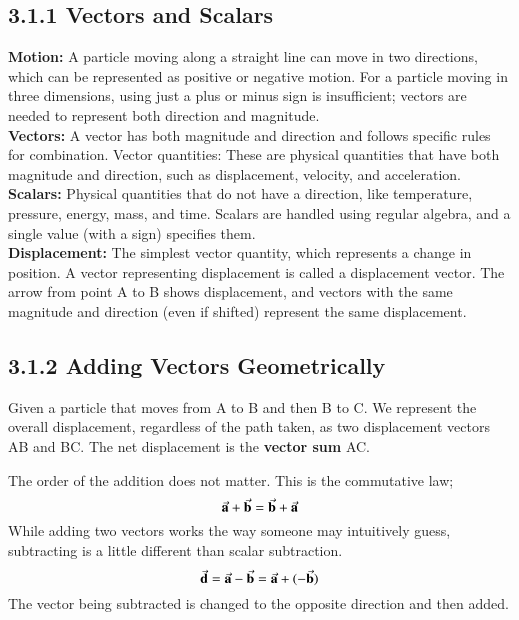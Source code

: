 \documentclass{article}
\begin{document}
\subsection*{3.1.1 Vectors and Scalars}
\textbf{Motion:}
	A particle moving along a straight line can move in two directions, which can be represented as positive or negative motion.
	For a particle moving in three dimensions, using just a plus or minus sign is insufficient; vectors are needed to represent both direction and magnitude.
\vspace{12pt}\\
\textbf{Vectors:}
    A vector has both magnitude and direction and follows specific rules for combination.
    Vector quantities: These are physical quantities that have both magnitude and direction, such as displacement, velocity, and acceleration.
\vspace{12pt}\\
\textbf{Scalars:}
    Physical quantities that do not have a direction, like temperature, pressure, energy, mass, and time.
    Scalars are handled using regular algebra, and a single value (with a sign) specifies them.
\vspace{12pt}\\
\textbf{Displacement:}
    The simplest vector quantity, which represents a change in position.
    A vector representing displacement is called a displacement vector.
    The arrow from point A to B shows displacement, and vectors with the same magnitude and direction (even if shifted) represent the same displacement.

\subsection*{3.1.2 Adding Vectors Geometrically}
Given a particle that moves from A to B and then B to C.
We represent the overall displacement, regardless of the path taken, as two displacement vectors AB and BC.
The net displacement is the \textbf{vector sum} AC.
\begin{center}
\end{center}
The order of the addition does not matter. This is the commutative law;
\[
	\va{a} + \va{b} = \va{b} + \va{a}
\]
While adding two vectors works the way someone may intuitively guess, subtracting is a little different than scalar subtraction.
\[
	\va{d} = \va{a} - \va{b} = \va{a} + (-\va{b})
\]
The vector being subtracted is changed to the opposite direction and then added.
\end{document}
